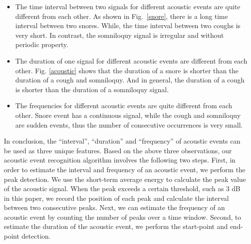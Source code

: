 \begin{itemize}[itemsep=1mm,nolistsep]
\item The time interval between two signals for different acoustic events are quite different from each other. As shown in Fig.~\ref{snore}, there is a long time interval between two snores. While, the time interval between two coughs is very short.  In contrast, the  somniloquy signal is irregular and without periodic property.
 \item The duration of one signal for different acoustic events are different from each other. Fig. \ref{acoustic} shows that the duration of a snore is shorter than the duration of a cough and somniloquy. And in general, the duration of a cough is shorter than the duration of a somniloquy signal.
\item The frequencies for different acoustic events are quite different from each other. Snore event has a continuous signal, while the  cough and somniloquy are sudden events, thus the number of consecutive occurrences is very small.
\end{itemize}
In conclusion, the ``interval'', ``duration'' and ``frequency'' of acoustic events can be used as three unique features. Based on the above three observations, our acoustic event recognition algorithm involves the following two steps. First, in order to estimate the interval and frequency of an acoustic event, we perform the peak detection. We use the short-term average energy to calculate the peak value of the acoustic signal. When the peak exceeds a certain threshold, such as 3 dB in this paper, we record the position of each peak and calculate the interval between two consecutive peaks. Next, we can estimate the frequency of an acoustic event by counting the number of peaks over a time window. Second, to estimate the duration of the acoustic event, we perform the start-point and end-point detection.

